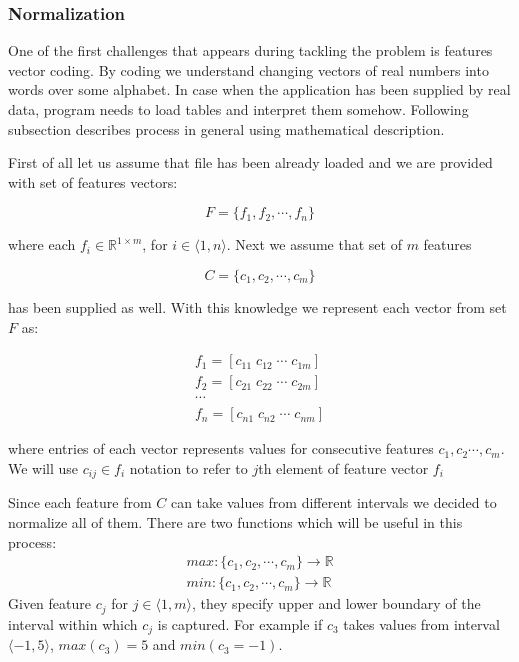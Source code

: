 \documentclass{mini}
\begin{document}
\subsubsection{Normalization} \label{sec:lan_theory_word_transf_norm}
One of the first challenges that appears during tackling the problem is features vector coding. By coding we understand changing vectors of real numbers into words over some alphabet. In case when the application has been supplied by real data, program needs to load tables and interpret them somehow. Following subsection describes process in general using mathematical description.

First of all let us assume that file has been already loaded and we are provided with set of features vectors: 

\[ F = \{ f_1 , f_2, \cdots , f_n \} \]

where each $f_i \in \mathbb{R}^{1 \times m}$, for $i \in \langle 1,n \rangle$.
Next we assume that set of $m$ features 

\[ C = \{ c_1 , c_2, \cdots , c_m \}\] 

has been supplied as well. With this knowledge we represent each vector from set $F$ as: 

\begin{align*}
f_1 = [ c_{11} \; c_{12} \; \cdots \; c_{1m}] \\
f_2 = [ c_{21} \; c_{22} \; \cdots \; c_{2m}] \\
\cdots \\
f_n = [ c_{n1} \; c_{n2} \; \cdots \; c_{nm}] 
\end{align*}

where entries of each vector represents values for consecutive features $c_1, c_2 \cdots , c_m$. We will use $c_{ij }\in f_i$ notation to refer to $j$th element of feature vector $f_i$

Since each feature from $C$ can take values from different intervals we decided to normalize all of them. There are two functions which will be useful in this process:
\begin{align*}
max : \{c_1, c_2, \cdots, c_m\} \rightarrow \mathbb{R} \\
min : \{c_1, c_2, \cdots, c_m\} \rightarrow \mathbb{R}
\end{align*}
Given feature $c_j$ for $j \in \langle 1, m \rangle$, they specify upper and lower boundary of the interval within which $c_j$ is captured. For example if $c_3$ takes values from interval $\langle -1 , 5 \rangle$, $max(c_3) = 5$ and $min(c_3 = -1)$.
\end{document}
